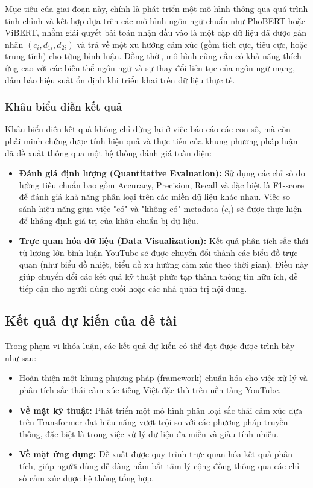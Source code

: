 \documentclass{article}[12pt]
\begin{document}
{    Mục tiêu của giai đoạn này, chính là phát triển một mô hình thông qua quá trình tinh chỉnh và kết hợp dựa trên các mô hình ngôn ngữ chuẩn như PhoBERT hoặc ViBERT, nhằm giải quyết bài toán nhận đầu vào là một cặp dữ liệu đã được gán nhãn $(c_i, d_{1i}, d_{2i})$ và trả về một xu hướng cảm xúc (gồm tích cực, tiêu cực, hoặc trung tính) cho từng bình luận. Đồng thời, mô hình cũng cần có khả năng thích ứng cao với các biến thể ngôn ngữ và sự thay đổi liên tục của ngôn ngữ mạng, đảm bảo hiệu suất ổn định khi triển khai trên dữ liệu thực tế.

    \subsubsection{Khâu biểu diễn kết quả}
    Khâu biểu diễn kết quả không chỉ dừng lại ở việc báo cáo các con số, mà còn phải minh chứng được tính hiệu quả và thực tiễn của khung phương pháp luận đã đề xuất thông qua một hệ thống đánh giá toàn diện:
    \begin{itemize}
        \item \textbf{Đánh giá định lượng (Quantitative Evaluation):} Sử dụng các chỉ số đo lường tiêu chuẩn bao gồm Accuracy, Precision, Recall và đặc biệt là F1-score để đánh giá khả năng phân loại trên các miền dữ liệu khác nhau. Việc so sánh hiệu năng giữa việc "có" và "không có" metadata ($c_i$) sẽ được thực hiện để khẳng định giá trị của khâu chuẩn bị dữ liệu.
        \item \textbf{Trực quan hóa dữ liệu (Data Visualization):} Kết quả phân tích sắc thái từ lượng lớn bình luận YouTube sẽ được chuyển đổi thành các biểu đồ trực quan (như biểu đồ nhiệt, biểu đồ xu hướng cảm xúc theo thời gian). Điều này giúp chuyển đổi các kết quả kỹ thuật phức tạp thành thông tin hữu ích, dễ tiếp cận cho người dùng cuối hoặc các nhà quản trị nội dung.
    \end{itemize}
    
    \subsection{Kết quả dự kiến của đề tài}
    Trong phạm vi khóa luận, các kết quả dự kiến có thể đạt được được trình bày như sau:
    \begin{itemize}
        \item Hoàn thiện một khung phương pháp (framework) chuẩn hóa cho việc xử lý và phân tích sắc thái cảm xúc tiếng Việt đặc thù trên nền tảng YouTube.
        \item \textbf{Về mặt kỹ thuật:} Phát triển một mô hình phân loại sắc thái cảm xúc dựa trên Transformer đạt hiệu năng vượt trội so với các phương pháp truyền thống, đặc biệt là trong việc xử lý dữ liệu đa miền và giàu tính nhiễu.
        \item \textbf{Về mặt ứng dụng:} Đề xuất được quy trình trực quan hóa kết quả phân tích, giúp người dùng dễ dàng nắm bắt tâm lý cộng đồng thông qua các chỉ số cảm xúc được hệ thống tổng hợp.
    \end{itemize}
    
}
\end{document}
